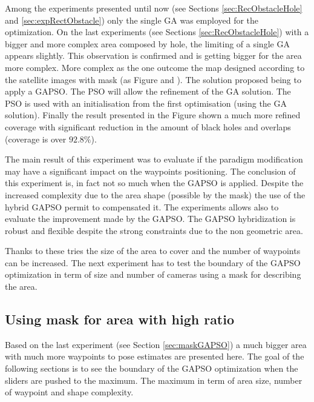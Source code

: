    Among the experiments presented until now (see Sections \ref{sec:RecObstacleHole} and \ref{sec:expRectObstacle}) only the single GA was employed for the optimization. On the last experiments (see Sections \ref{sec:RecObstacleHole}) with a bigger and more complex area composed by hole, the limiting of a single GA appears slightly. This observation is confirmed and is getting bigger for the area more complex. More complex as the one outcome the map designed according to the satellite images with mask (as  Figure  and ).
The solution proposed being to apply a GAPSO. The PSO will allow the refinement of the GA solution.
The PSO is used with an initialisation from the first optimisation (using  the GA solution). 
Finally the result presented in the Figure  shown a much more refined coverage with significant reduction in the amount of black holes and overlaps (coverage is over $92.8\%$). 

The main result of this experiment was to evaluate if the paradigm modification may have a significant impact on the waypoints positioning.
 The conclusion of this experiment is, in fact not so much when the GAPSO is applied. Despite the increased complexity due to the area shape (possible by the mask) the use of the hybrid GAPSO permit to compensated it. The experiments allows also to evaluate the improvement made by the GAPSO. The GAPSO hybridization is robust and flexible despite the strong constraints due to the non geometric area.  

Thanks to these tries the size of the area to cover and the number of waypoints can be increased. The next experiment has to test the boundary of the GAPSO optimization in term of size and number of cameras using a mask for describing the area.


	\subsection{Using mask for area with high ratio}
	Based on the last experiment (see Section \ref{sec:maskGAPSO}) a much bigger area with much more waypoints to pose estimates are presented here. The goal of the following sections is to see the boundary of the  GAPSO optimization when the sliders are pushed to the maximum. The maximum in term of area size, number of waypoint and shape complexity.
	
